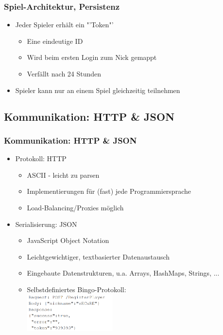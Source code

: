 \documentclass{beamer}
\begin{document}
\begin{frame}[fragile]
\frametitle{Spiel-Architektur, Persistenz}
\begin{itemize}
\item Jeder Spieler erhält ein "'Token"'
\begin{itemize}
\item Eine eindeutige ID
\item Wird beim ersten Login zum Nick gemappt
\item Verfällt nach 24 Stunden
\end{itemize}
\item Spieler kann nur an einem Spiel gleichzeitig teilnehmen
\end{itemize}
\end{frame}


\subsection{Kommunikation: HTTP \& JSON}
\begin{frame}[fragile]
\frametitle{Kommunikation: HTTP \& JSON}
\begin{itemize}
\item Protokoll: HTTP
\begin{itemize}
\item ASCII - leicht zu parsen
\item Implementierungen für (fast) jede Programmiersprache
\item Load-Balancing/Proxies möglich
\end{itemize}
\item Serialisierung: JSON
\begin{itemize}
\item JavaScript Object Notation
\item Leichtgewichtiger, textbasierter Datenaustausch
\item Eingebaute Datenstrukturen, u.a. Arrays, HashMaps, Strings, ...
\item Selbstdefiniertes Bingo-Protokoll: \\
\includegraphics[height=2cm]{protocol.png}
\end{itemize}
\end{itemize}
\end{frame}
\end{document}
